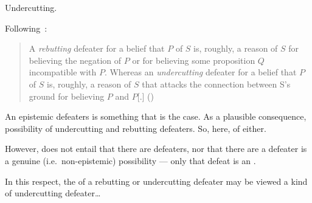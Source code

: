 \begin{note}
  Undercutting.

  Following~\citeauthor{Moretti:2018va}:
  \begin{quote}
    A \emph{rebutting} defeater for a belief that \(P\) of \(S\) is, roughly, a reason of \(S\) for believing the negation of \(P\) or for believing some proposition \(Q\) incompatible with \(P\).
    Whereas an \emph{undercutting} defeater for a belief that \(P\) of \(S\) is, roughly, a reason of \(S\) that attacks the connection between S's ground for believing \(P\) and \(P\)[.]\nolinebreak
    \mbox{}\hfill\mbox{(\citeyear{Moretti:2018va})}
  \end{quote}
\end{note}

\begin{note}
  An epistemic defeaters is something that is the case.
  As a plausible consequence, possibility of undercutting and rebutting defeaters.
  So, here, \ep{} of either.
\end{note}

\begin{note}
  However, does not entail that there are defeaters, nor that there are a defeater is a genuine (i.e.\ non-epistemic) possibility --- only that defeat is an \ep{}.
\end{note}

\begin{note}
  In this respect, the \ep{} of a rebutting or undercutting defeater may be viewed a kind of undercutting defeater\dots
\end{note}

